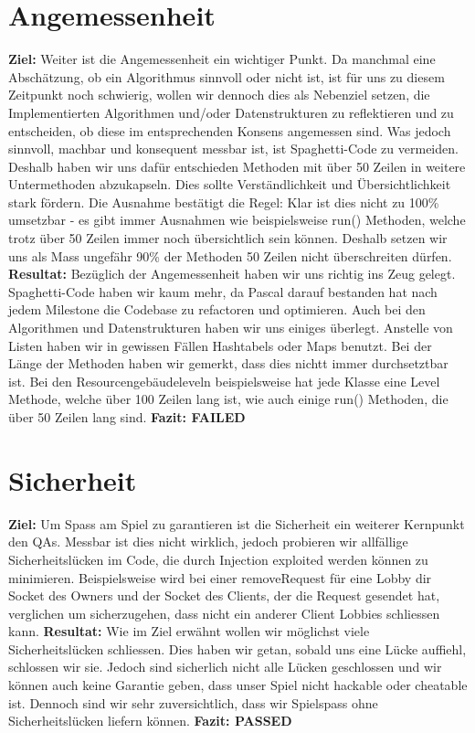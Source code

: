 \documentclass[]{scrartcl}
\newcommand{\n}{\newline}
\begin{document}
\section{Angemessenheit}
\textbf{Ziel:} Weiter ist die Angemessenheit ein wichtiger Punkt. Da manchmal eine Abschätzung, ob ein Algorithmus sinnvoll oder nicht ist, ist  für uns zu diesem Zeitpunkt noch schwierig, wollen wir dennoch dies als Nebenziel setzen, die Implementierten Algorithmen und/oder Datenstrukturen zu reflektieren und zu entscheiden, ob diese im entsprechenden Konsens angemessen sind. Was jedoch sinnvoll, machbar und konsequent messbar ist, ist Spaghetti-Code zu vermeiden. Deshalb haben wir uns dafür entschieden Methoden mit über 50 Zeilen in weitere Untermethoden abzukapseln. Dies sollte Verständlichkeit und Übersichtlichkeit stark fördern. Die Ausnahme bestätigt die Regel: Klar ist dies nicht zu 100\% umsetzbar - es gibt immer Ausnahmen wie beispielsweise run() Methoden, welche trotz über 50 Zeilen immer noch übersichtlich sein können. Deshalb setzen wir uns als Mass ungefähr 90\% der Methoden 50 Zeilen nicht überschreiten dürfen.\n
\textbf{Resultat:} Bezüglich der Angemessenheit haben wir uns richtig ins Zeug gelegt. Spaghetti-Code haben wir kaum mehr, da Pascal darauf bestanden hat nach jedem Milestone die Codebase zu refactoren und optimieren. Auch bei den Algorithmen und Datenstrukturen haben wir uns einiges überlegt. Anstelle von Listen haben wir in gewissen Fällen Hashtabels oder Maps benutzt. Bei der Länge der Methoden haben wir gemerkt, dass dies nichtt immer durchsetztbar ist. Bei den Resourcengebäudeleveln beispielsweise hat jede Klasse eine Level Methode, welche über 100 Zeilen lang ist, wie auch einige run() Methoden, die über 50 Zeilen lang sind.\n
\textbf{Fazit: FAILED}
\section{Sicherheit}
\textbf{Ziel:} Um Spass am Spiel zu garantieren ist die Sicherheit ein weiterer Kernpunkt den QAs. Messbar ist dies nicht wirklich, jedoch probieren wir allfällige Sicherheitslücken im Code, die durch Injection exploited werden können zu minimieren. Beispielsweise wird bei einer removeRequest für eine Lobby dir Socket des Owners und der Socket des Clients, der die Request gesendet hat, verglichen um sicherzugehen, dass nicht ein anderer Client Lobbies schliessen kann.\n
\textbf{Resultat:} Wie im Ziel erwähnt wollen wir möglichst viele Sicherheitslücken schliessen. Dies haben wir getan, sobald uns eine Lücke auffiehl, schlossen wir sie. Jedoch sind sicherlich nicht alle Lücken geschlossen und wir können auch keine Garantie geben, dass unser Spiel nicht hackable oder cheatable ist. Dennoch sind wir sehr zuversichtlich, dass wir Spielspass ohne Sicherheitslücken liefern können.\n
\textbf{Fazit: PASSED}
\end{document}
